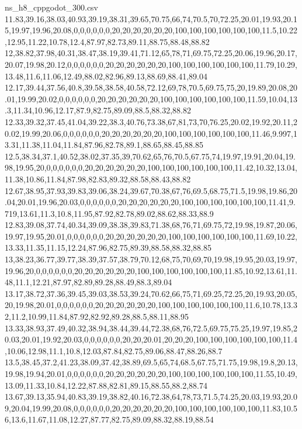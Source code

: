 \begin{filecontents*}[overwrite]{ns_h8_cppgodot_300.csv}
11.83,39.16,38.03,40.93,39.19,38.31,39.65,70.75,66,74,70.5,70,72.25,20.01,19.93,20.15,19.97,19.96,20.08,0,0,0,0,0,0,20,20,20,20,20,20,100,100,100,100,100,100,11.5,10.22,12.95,11.22,10.78,12.4,87.97,82.73,89.11,88.75,88.48,88.82
12,38.82,37.98,40.31,38.47,38.19,39.41,71.12,65,78,71,69.75,72.25,20.06,19.96,20.17,20.07,19.98,20.12,0,0,0,0,0,0,20,20,20,20,20,20,100,100,100,100,100,100,11.79,10.29,13.48,11.6,11.06,12.49,88.02,82.96,89.13,88.69,88.41,89.04
12.17,39.44,37.56,40.8,39.58,38.58,40.58,72.12,69,78,70.5,69.75,75,20,19.89,20.08,20.01,19.99,20.02,0,0,0,0,0,0,20,20,20,20,20,20,100,100,100,100,100,100,11.59,10.04,13.3,11.34,10.96,12.17,87.9,82.75,89.09,88.5,88.32,88.82
12.33,39.32,37.45,41.04,39.22,38.3,40.76,73.38,67,81,73,70,76.25,20.02,19.92,20.11,20.02,19.99,20.06,0,0,0,0,0,0,20,20,20,20,20,20,100,100,100,100,100,100,11.46,9.997,13.31,11.38,11.04,11.84,87.96,82.78,89.1,88.65,88.45,88.85
12.5,38.34,37.1,40.52,38.02,37.35,39,70.62,65,76,70.5,67.75,74,19.97,19.91,20.04,19.98,19.95,20,0,0,0,0,0,0,20,20,20,20,20,20,100,100,100,100,100,100,11.42,10.32,13.04,11.38,10.86,11.84,87.98,82.83,89.32,88.58,88.43,88.82
12.67,38.95,37.93,39.83,39.06,38.24,39.67,70.38,67,76,69.5,68.75,71.5,19.98,19.86,20.04,20.01,19.96,20.03,0,0,0,0,0,0,20,20,20,20,20,20,100,100,100,100,100,100,11.41,9.719,13.61,11.3,10.8,11.95,87.92,82.78,89.02,88.62,88.33,88.9
12.83,39.08,37.74,40.34,39.09,38.38,39.83,71.38,68,76,71,69.75,72,19.98,19.87,20.06,19.97,19.95,20.01,0,0,0,0,0,0,20,20,20,20,20,20,100,100,100,100,100,100,11.69,10.22,13.33,11.35,11.15,12.24,87.96,82.75,89.39,88.58,88.32,88.85
13,38.23,36.77,39.77,38.39,37.57,38.79,70.12,68,75,70,69,70,19.98,19.95,20.03,19.97,19.96,20,0,0,0,0,0,0,20,20,20,20,20,20,100,100,100,100,100,100,11.85,10.92,13.61,11.48,11.1,12.21,87.97,82.89,89.28,88.49,88.3,89.04
13.17,38.72,37.36,39.45,39.03,38.53,39.24,70.62,66,75,71,69.25,72.25,20,19.93,20.05,20,19.98,20.01,0,0,0,0,0,0,20,20,20,20,20,20,100,100,100,100,100,100,11.6,10.78,13.32,11.2,10.99,11.84,87.92,82.92,89.28,88.5,88.11,88.95
13.33,38.93,37.49,40.32,38.94,38.44,39.44,72.38,68,76,72.5,69.75,75.25,19.97,19.85,20.03,20.01,19.92,20.03,0,0,0,0,0,0,20,20,20.01,20,20,20,100,100,100,100,100,100,11.4,10.06,12.98,11.1,10.8,12.03,87.84,82.75,89.06,88.47,88.26,88.7
13.5,38.45,37.2,41.23,38.09,37.42,38.89,69.5,65,74,68.5,67.75,71.75,19.98,19.8,20.13,19.98,19.94,20.01,0,0,0,0,0,0,20,20,20,20,20,20,100,100,100,100,100,100,11.55,10.49,13.09,11.33,10.84,12.22,87.88,82.81,89.15,88.55,88.2,88.74
13.67,39.13,35.94,40.83,39.19,38.82,40.16,72.38,64,78,73,71.5,74.25,20.03,19.93,20.09,20.04,19.99,20.08,0,0,0,0,0,0,20,20,20,20,20,20,100,100,100,100,100,100,11.83,10.56,13.6,11.67,11.08,12.27,87.77,82.75,89.09,88.32,88.19,88.54

\end{filecontents*}
